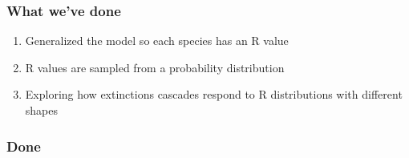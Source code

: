\documentclass[12pt]{article}
\begin{document}
\subsubsection*{What we've done}

\begin{enumerate}
	\item{Generalized the model so each species has an R value}
	\item{R values are sampled from a probability distribution}
	\item{Exploring how extinctions cascades respond to R distributions with different shapes}	
\end{enumerate}







\subsubsection*{Done}
\end{document}
